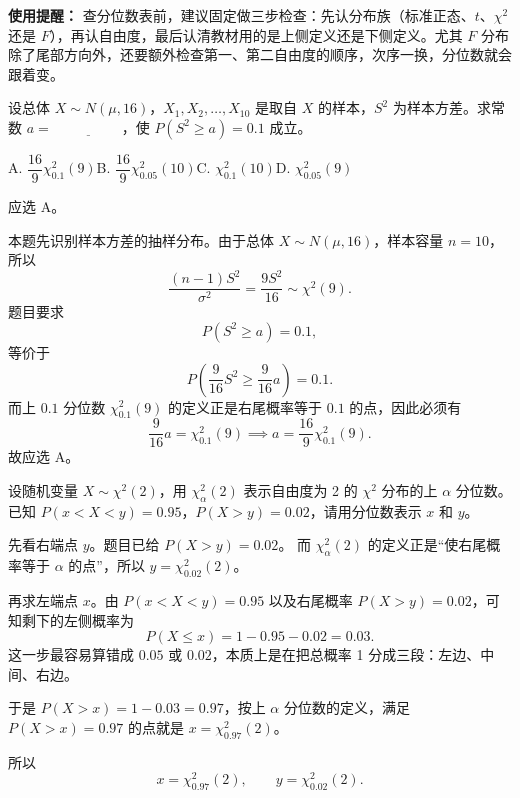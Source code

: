 ﻿\documentclass[lang=cn,11pt]{elegantbook}
\begin{document}
\begin{note}
\textbf{使用提醒：} 查分位数表前，建议固定做三步检查：先认分布族（标准正态、\(t\)、\(\chi^2\) 还是 \(F\)），再认自由度，最后认清教材用的是上侧定义还是下侧定义。尤其 \(F\) 分布除了尾部方向外，还要额外检查第一、第二自由度的顺序，次序一换，分位数就会跟着变。
\end{note}

\begin{exercise}\label{exer:6-quantile-s2}
设总体 \(X \sim N(\mu, 16)\)，\(X_1, X_2, \dots, X_{10}\) 是取自 \(X\) 的样本，\(S^2\) 为样本方差。求常数 \(a =\,\underline{\hspace{2cm}}\)，使 \(P(S^2 \geq a) = 0.1\) 成立。\par
A. \(\dfrac{16}{9}\chi_{0.1}^2(9)\)\quad B. \(\dfrac{16}{9}\chi_{0.05}^2(10)\)\quad C. \(\chi_{0.1}^2(10)\)\quad D. \(\chi_{0.05}^2(9)\)
\end{exercise}

\begin{solution}
应选 A。

本题先识别样本方差的抽样分布。由于总体 \(X \sim N(\mu,16)\)，样本容量 \(n=10\)，所以
\[
\frac{(n-1)S^2}{\sigma^2}=\frac{9S^2}{16}\sim\chi^2(9).
\]
题目要求
\[
P(S^2 \geq a)=0.1,
\]
等价于
\[
P\!\left(\frac{9}{16}S^2 \geq \frac{9}{16}a\right)=0.1.
\]
而上 \(0.1\) 分位数 \(\chi_{0.1}^2(9)\) 的定义正是右尾概率等于 \(0.1\) 的点，因此必须有
\[
\frac{9}{16}a = \chi_{0.1}^2(9)\implies a = \frac{16}{9}\chi_{0.1}^2(9).
\]
故应选 A。
\end{solution}

\begin{exercise}\label{exer:6-quantile-range}
设随机变量 \(X \sim \chi^2(2)\)，用 \(\chi_\alpha^2(2)\) 表示自由度为 2 的 \(\chi^2\) 分布的上 \(\alpha\) 分位数。已知 \(P(x < X < y) = 0.95\)，\(P(X > y) = 0.02\)，请用分位数表示 \(x\) 和 \(y\)。
\end{exercise}

\begin{solution}
先看右端点 \(y\)。题目已给 \(P(X>y)=0.02\)。
而 \(\chi^2_\alpha(2)\) 的定义正是“使右尾概率等于 \(\alpha\) 的点”，所以 \(y=\chi^2_{0.02}(2)\)。

再求左端点 \(x\)。由 \(P(x<X<y)=0.95\) 以及右尾概率 \(P(X>y)=0.02\)，可知剩下的左侧概率为
\[
P(X\le x)=1-0.95-0.02=0.03.
\]
这一步最容易算错成 \(0.05\) 或 \(0.02\)，本质上是在把总概率 1 分成三段：左边、中间、右边。

于是 \(P(X>x)=1-0.03=0.97\)，按上 \(\alpha\) 分位数的定义，满足 \(P(X>x)=0.97\) 的点就是 \(x=\chi^2_{0.97}(2)\)。

所以
\[
x=\chi^2_{0.97}(2),\qquad y=\chi^2_{0.02}(2).
\]
\end{solution}
\end{document}
